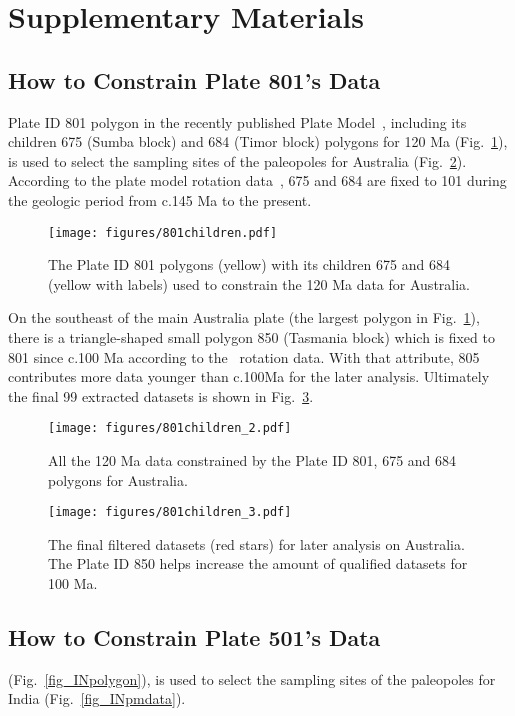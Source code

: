 \section{Supplementary Materials}

\subsection{How to Constrain Plate 801's Data}
Plate ID 801 polygon in the recently published Plate Model~\cite{Y18}, including
its children 675 (Sumba block) and 684 (Timor block) polygons for
120 Ma (Fig.~\ref{fig_AUpolygon}), is used to select the sampling
sites of the paleopoles for Australia (Fig.~\ref{fig_AUpmdata}). According to
the plate model rotation data~\cite{Y18}, 675 and 684 are fixed to 101 during
the geologic period from c.145 Ma to the present.

\begin{figure}
\texttt{[image: figures/801children.pdf]}
\caption{The Plate ID 801 polygons (yellow) with its children 675 and 684
(yellow with labels) used to constrain the 120 Ma data for
Australia.}\label{fig_AUpolygon}
\end{figure}

On the southeast of the main Australia plate (the largest polygon in
Fig.~\ref{fig_AUpolygon}), there is a triangle-shaped small polygon 850
(Tasmania block) which is fixed to 801 since c.100 Ma according to
the~\cite{Y18} rotation data. With that attribute, 805 contributes more data
younger than c.100Ma for the later analysis. Ultimately the final 99 extracted
datasets is shown in Fig.~\ref{fig_AUfinal}.

\begin{figure}
\texttt{[image: figures/801children\_2.pdf]}
\caption{All the 120 Ma data constrained by the Plate ID 801, 675
and 684 polygons for Australia.}\label{fig_AUpmdata}
\end{figure}

\begin{figure}
\texttt{[image: figures/801children\_3.pdf]}
\caption{The final filtered datasets (red stars) for later analysis on
Australia. The Plate ID 850 helps increase the amount of qualified datasets for
100 Ma.}\label{fig_AUfinal}
\end{figure}

\subsection{How to Constrain Plate 501's Data}
(Fig.~\ref{fig_INpolygon}), is used to select the sampling
sites of the paleopoles for India (Fig.~\ref{fig_INpmdata}).

